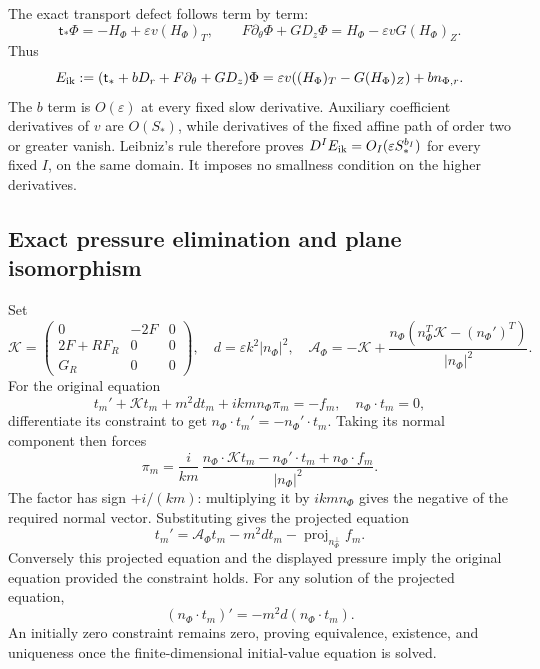 \documentclass[10pt,a4paper]{article}
\begin{document}
The exact transport defect follows term by term: \[
\mathsf t_*\Phi=-H_\Phi+\varepsilon v(H_\Phi)_T,\qquad
F\partial_\theta\Phi+GD_z\Phi=H_\Phi-\varepsilon vG(H_\Phi)_Z.
\] Thus \[
E_{\rm ik}:=(\mathsf t_*+bD_r+F\partial_\theta+GD_z)\Phi
=\varepsilon v((H_\Phi)_T-G(H_\Phi)_Z)+bn_{\Phi,r}.
\] The \(b\) term is \(O(\varepsilon)\) at every fixed slow derivative. Auxiliary coefficient derivatives of \(v\) are \(O(S_*)\), while derivatives of the fixed affine path of order two or greater vanish. Leibniz's rule therefore proves \(D^IE_{\rm ik}=O_I(\varepsilon S_*^{b_I})\) for every fixed \(I\), on the same domain. It imposes no smallness condition on the higher derivatives.

\subsection{Exact pressure elimination and plane isomorphism}\label{exact-pressure-elimination-and-plane-isomorphism}

Set \[
\mathcal K=
\begin{pmatrix}0&-2F&0\\2F+RF_R&0&0\\G_R&0&0\end{pmatrix},
\quad d=\varepsilon k^2|n_\Phi|^2,\quad
\mathcal A_\Phi=-\mathcal K+
\frac{n_\Phi(n_\Phi^T\mathcal K-(n_\Phi')^T)}{|n_\Phi|^2}.
\] For the original equation \[
t_m'+\mathcal Kt_m+m^2dt_m+ikm n_\Phi\pi_m=-f_m,
\quad n_\Phi\cdot t_m=0,
\] differentiate its constraint to get \(n_\Phi\cdot t_m'=-n_\Phi'\cdot t_m\). Taking its normal component then forces \[
\pi_m=\frac{i}{km}\,
\frac{n_\Phi\cdot\mathcal Kt_m-n_\Phi'\cdot t_m+n_\Phi\cdot f_m}{|n_\Phi|^2}.
\] The factor has sign \(+i/(km)\): multiplying it by \(ikm n_\Phi\) gives the negative of the required normal vector. Substituting gives the projected equation \[
t_m'=\mathcal A_\Phi t_m-m^2dt_m-\operatorname{proj}_{n_\Phi^\perp}f_m.
\] Conversely this projected equation and the displayed pressure imply the original equation provided the constraint holds. For any solution of the projected equation, \[
(n_\Phi\cdot t_m)'=-m^2d(n_\Phi\cdot t_m).
\] An initially zero constraint remains zero, proving equivalence, existence, and uniqueness once the finite-dimensional initial-value equation is solved.
\end{document}
